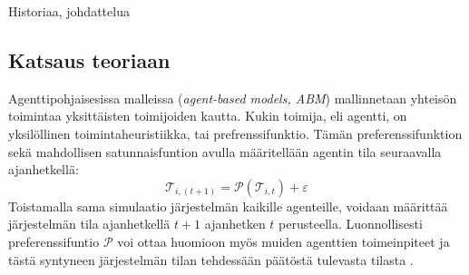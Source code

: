 \documentclass[finnish,gradu,twoside,12pt]{tktltiki}
\begin{document}
Historiaa, johdattelua

\subsection{Katsaus teoriaan}

Agenttipohjaisesissa malleissa (\textit{agent-based models, ABM}) mallinnetaan yhteisön toimintaa yksittäisten toimijoiden kautta. Kukin toimija, eli agentti, on yksilöllinen toimintaheuristiikka, tai prefrenssifunktio. Tämän preferenssifunktion sekä mahdollisen satunnaisfuntion avulla määritellään agentin tila seuraavalla ajanhetkellä: \begin{equation}\mathcal{T}_{i,(t+1)} = \mathcal{P}( \mathcal{T}_{i,t} ) + \varepsilon \label{abm:yhtälö}\end{equation} Toistamalla sama simulaatio järjestelmän kaikille agenteille, voidaan määrittää järjestelmän tila ajanhetkellä $t+1$ ajanhetken $t$ perusteella. Luonnollisesti preferenssifuntio $\mathcal{P}$ voi ottaa huomioon myös muiden agenttien toimeinpiteet ja tästä syntyneen järjestelmän tilan tehdessään päätöstä tulevasta tilasta \citep[esimerkiksi][]{Bonabeau2002}. 
\end{document}
